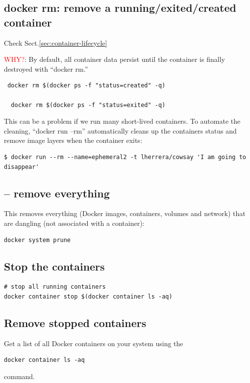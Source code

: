 \subsection{docker rm: remove a running/exited/created container}
\label{sec:docker-rm}

Check Sect.\ref{sec:container-lifecycle}

\textcolor{red}{WHY?}:  By default, all container data persist until the
container is finally destroyed with “docker rm.”
\begin{verbatim}
 docker rm $(docker ps -f "status=created" -q) 
 
  docker rm $(docker ps -f "status=exited" -q) 
\end{verbatim}

This can be a problem if we run many short-lived containers. To automate the
cleaning, “docker run --rm” automatically cleans up the containers status and
remove image layers when the container exits:
\begin{verbatim}
$ docker run --rm --name=ephemeral2 -t lherrera/cowsay 'I am going to disappear'
\end{verbatim}


\subsection{-- remove everything}

This removes everything (Docker images, containers, volumes and network) that
are dangling (not associated with a container):
\begin{verbatim}
docker system prune
\end{verbatim}

\subsection{Stop the containers}

\begin{verbatim}
# stop all running containers
docker container stop $(docker container ls -aq)
\end{verbatim}


\subsection{Remove stopped containers}


Get a list of all Docker containers on your system using the 
\begin{verbatim}
docker container ls -aq 
\end{verbatim}
command.

